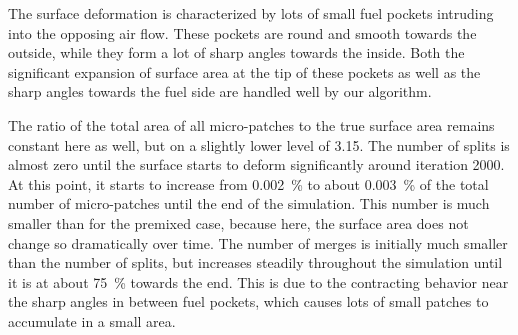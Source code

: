 %
The surface deformation is characterized by lots of small fuel pockets intruding
into the opposing air flow.
%
These pockets are round and smooth towards the outside, while they form a lot of
sharp angles towards the inside.
%
Both the significant expansion of surface area at the tip of these pockets as
well as the sharp angles towards the fuel side are handled well by our
algorithm.
%

%
The ratio of the total area of all micro-patches to the true surface area
remains constant here as well, but on a slightly lower level of \num{3.15}.
%
The number of splits is almost zero until the surface starts to deform
significantly around iteration \num{2000}.
%
At this point, it starts to increase from \SI{0.002}{\percent} to about
\SI{0.003}{\percent} of the total number of micro-patches until the end of the
simulation.
%
This number is much smaller than for the premixed case, because here, the
surface area does not change so dramatically over time.
%
The number of merges is initially much smaller than the number of splits, but
increases steadily throughout the simulation until it is at about
\SI{75}{\percent} towards the end.
%
This is due to the contracting behavior near the sharp angles in between fuel
pockets, which causes lots of small patches to accumulate in a small area.
%
%
